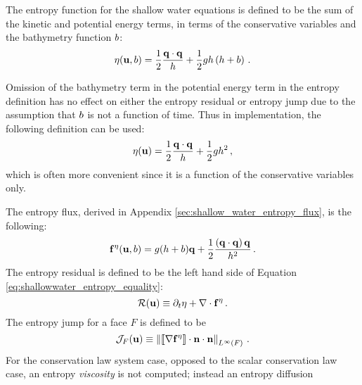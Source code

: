 The entropy function for the shallow water equations is defined to be
the sum of the kinetic and potential energy terms, in terms of the
conservative variables and the bathymetry function $b$:
\begin{equation}
  \eta(\mathbf{u},b)
  = \frac{1}{2}\frac{\mathbf{q}\cdot\mathbf{q}}
  {h} + \frac{1}{2}gh\left(h+b\right)
  \,.
\end{equation}
\begin{remark}
Omission of the bathymetry term in the potential energy
term in the entropy definition has no effect on either the entropy
residual or entropy jump due to the assumption that $b$ is
not a function of time. Thus in implementation, the following definition
can be used:
\begin{equation}
  \eta(\mathbf{u})
  = \frac{1}{2}\frac{\mathbf{q}\cdot\mathbf{q}}
  {h} + \frac{1}{2}gh^2
  \,,
\end{equation}
which is often more convenient since it is a function of the conservative
variables only.
\end{remark}
The entropy flux, derived in Appendix \ref{sec:shallow_water_entropy_flux}, is the
following:
\begin{equation}
  \mathbf{f}^\eta(\mathbf{u},b)
  = g(h + b)\mathbf{q}
  + \frac{1}{2}\frac{\left(\mathbf{q}\cdot\mathbf{q}\right)\mathbf{q}} 
  {h^2}
  \,.
\end{equation}
The entropy residual is defined to be the left hand side of 
Equation \eqref{eq:shallowwater_entropy_equality}:
\begin{equation}
  \mathcal{R}(\mathbf{u}) \equiv \partial_t\eta
  + \nabla\cdot\mathbf{f}^\eta
  \,.
\end{equation}
The entropy jump for a face $F$ is defined to be
\begin{equation}
  \mathcal{J}_F(\mathbf{u})
  \equiv \left\|
    \left\llbracket\nabla\mathbf{f}^\eta\right\rrbracket
    \cdot\mathbf{n}\cdot\mathbf{n}
  \right\|_{L^\infty(F)} \,.
\end{equation}
For the conservation law system case, opposed to the scalar conservation
law case, an entropy \emph{viscosity} is not computed; instead an entropy diffusion
